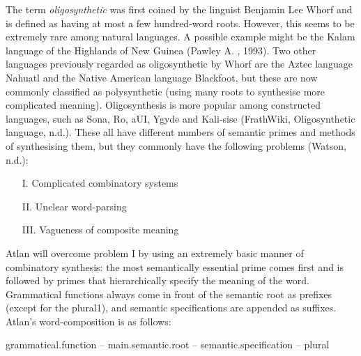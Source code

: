 
The term \textit{oligosynthetic} was first coined by the linguist Benjamin Lee Whorf and is defined as having at most a few hundred-word roots. However, this seems to be extremely rare among natural languages. A possible example might be the Kalam language of the Highlands of New Guinea (Pawley A. , 1993). Two other languages previously regarded as oligosynthetic by Whorf are the Aztec language Nahuatl and the Native American language Blackfoot, but these are now commonly classified as polysynthetic (using many roots to synthesise more complicated meaning). Oligosynthesis is more popular among constructed languages, such as Sona, Ro, aUI, Ygyde and Kali-sise (FrathWiki, Oligosynthetic language, n.d.). These all have different numbers of semantic primes and methods of synthesising them, but they commonly have the following problems (Watson, n.d.): 

\begin{itemize}
\item [I.] Complicated combinatory systems  

\item[II.] Unclear word-parsing  

\item[III.]Vagueness of composite meaning 
\end{itemize}

Atlan will overcome problem I by using an extremely basic manner of combinatory synthesis: the most semantically essential prime comes first and is followed by primes that hierarchically specify the meaning of the word. Grammatical functions always come in front of the semantic root as prefixes (except for the plural1), and semantic specifications are appended as suffixes. Atlan's word-composition is as follows:  

\begin{center}
{grammatical.function –  main.semantic.root – semantic.specification – plural} 
\end{center}
\quad
 

